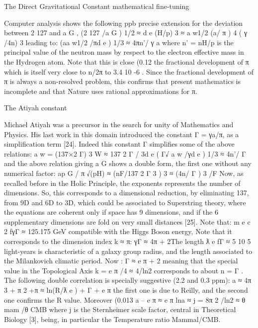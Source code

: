 The Direct Gravitational Constant mathematical fine-tuning

Computer analysis shows the following ppb precise extension for the deviation between 2 127 and
a G ,
(2 127 /a G ) 1/2 ≈ d e (H/p) 3 ≈ a w1/2 (a/ π ) 4 ( γ /4n) 3
leading to:
(aa w1/2 /πd e ) 1/3 ≈ 4πn'/ γ a
where n' = nH/p is the principal value of the neutron mass by respect to the electron effective mass
in the Hydrogen atom. Note that this is close (0.12 %
the fractional development of π which is itself very close to n/2π to 3.4 10 -6 . Since the fractional
development of π is always a non-resolved problem, this confirms that present mathematics is
incomplete and that Nature uses rational approximations for π.

The Atiyah constant

Michael Atiyah was a precursor in the search for unity of Mathematics and Physics. His last
work in this domain introduced the constant Γ = γa/π, as a simplification term [24]. Indeed this
constant Γ simplifies some of the above relations:
a w = (137×2 Γ) 3
W ≈ 137 2 Γ / 3d e
( Γ√ a w /γd e ) 1/3 ≈ 4n'/ Γ
and the above relation giving a G shows a double form, the first one without any numerical factor:
ap G / π √(pH) ≈ (nF/137 2 Γ 3 ) 3 ≈ (4n/ Γ ) 3 /F
Now, as recalled before in the Holic Principle, the exponents represents the number of
dimensions. So, this corresponds to a dimensional reduction, by eliminating 137, from 9D and 6D to
3D, which could be associated to Superstring theory, where the equations are coherent only if space
has 9 dimensions, and if the 6 supplementary dimensions are fold on very small distances [25].
Note that:
m e c 2 f{γΓ} ≈ 125.175 GeV
compatible with the Higgs Boson energy, Note that it corresponds to the dimension index k ≈ π: γΓ
≈ 4π + 2The length ƛ e f{Γ} ≈ 5 10 5 light-years is characteristic of a galaxy group radius, and the length
associated to the Milankovich climatic period. Now :
Γ ≈ e π + 2
meaning that the special value in the Topological Axis k = e π /4 ≈ 4/ln2 corresponds to about n = Γ .
The following double correlation is specially suggestive (2.2 and 0.3 ppm):
a ≈ 4π 3 + π 2 +π ≈ ln(R/ƛ e ) + Γ + e π
the first one is due to Reilly, and the second one confirms the R value. Moreover (0.013%
a – e π ≈ e π lna ≈ j = 8π 2 /ln2 ≈ θ mam /θ CMB
where j is the Sternheimer scale factor, central in Theoretical Biology [3], being, in particular the
Temperature ratio Mammal/CMB.
